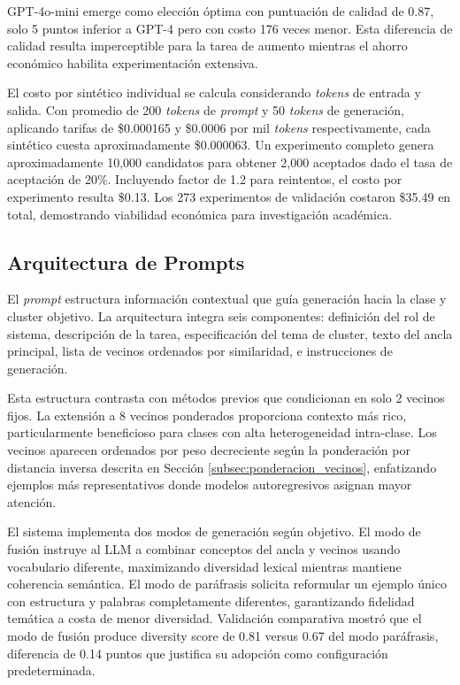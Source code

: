 GPT-4o-mini emerge como elección óptima con puntuación de calidad de 0.87, solo 5 puntos inferior a GPT-4 pero con costo 176 veces menor. Esta diferencia de calidad resulta imperceptible para la tarea de aumento mientras el ahorro económico habilita experimentación extensiva.

El costo por sintético individual se calcula considerando \textit{tokens} de entrada y salida. Con promedio de 200 \textit{tokens} de \textit{prompt} y 50 \textit{tokens} de generación, aplicando tarifas de \$0.000165 y \$0.0006 por mil \textit{tokens} respectivamente, cada sintético cuesta aproximadamente \$0.000063. Un experimento completo genera aproximadamente 10,000 candidatos para obtener 2,000 aceptados dado el tasa de aceptación de 20\%. Incluyendo factor de 1.2 para reintentos, el costo por experimento resulta \$0.13. Los 273 experimentos de validación costaron \$35.49 en total, demostrando viabilidad económica para investigación académica.

\subsection{Arquitectura de Prompts}
\label{subsec:prompts}

El \textit{prompt} estructura información contextual que guía generación hacia la clase y cluster objetivo. La arquitectura integra seis componentes: definición del rol de sistema, descripción de la tarea, especificación del tema de cluster, texto del ancla principal, lista de vecinos ordenados por similaridad, e instrucciones de generación.

Esta estructura contrasta con métodos previos que condicionan en solo 2 vecinos fijos. La extensión a 8 vecinos ponderados proporciona contexto más rico, particularmente beneficioso para clases con alta heterogeneidad intra-clase. Los vecinos aparecen ordenados por peso decreciente según la ponderación por distancia inversa descrita en Sección \ref{subsec:ponderacion_vecinos}, enfatizando ejemplos más representativos donde modelos autoregresivos asignan mayor atención.

El sistema implementa dos modos de generación según objetivo. El modo de fusión instruye al LLM a combinar conceptos del ancla y vecinos usando vocabulario diferente, maximizando diversidad lexical mientras mantiene coherencia semántica. El modo de paráfrasis solicita reformular un ejemplo único con estructura y palabras completamente diferentes, garantizando fidelidad temática a costa de menor diversidad. Validación comparativa mostró que el modo de fusión produce diversity score de 0.81 versus 0.67 del modo paráfrasis, diferencia de 0.14 puntos que justifica su adopción como configuración predeterminada.

